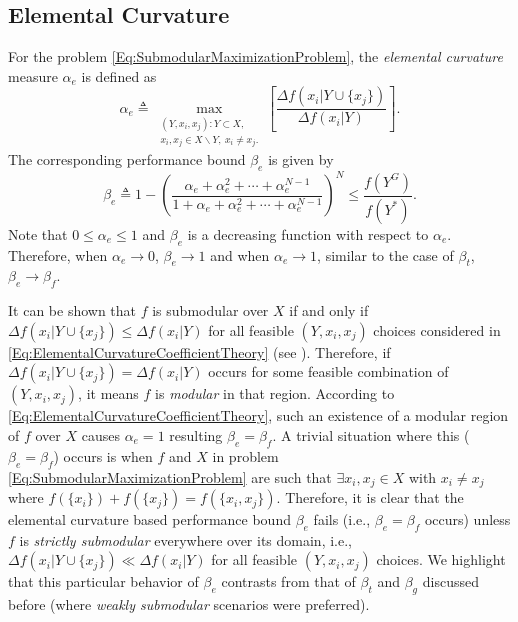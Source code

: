 \documentclass[conference]{IEEEtran}
\begin{document}

\subsection{Elemental Curvature \cite{Wang2016}}\label{SubSec:ElementalCurvature}

For the problem \eqref{Eq:SubmodularMaximizationProblem}, the \emph{elemental curvature} measure $\alpha_e$ is defined as 
\begin{equation}\label{Eq:ElementalCurvatureCoefficientTheory}
    \alpha_e \triangleq \max_{\substack{(Y,x_i,x_j): Y \subset X,\\ x_i,x_j \in X \backslash Y,\ x_i \neq x_j.}}\left[\frac{\Delta f(x_i \vert Y \cup \{x_j\})}{\Delta f(x_i \vert Y)}\right].
\end{equation}
The corresponding performance bound $\beta_e$ is given by 
\begin{equation}\label{Eq:ElementalCurvatureBoundTheory}
    \beta_e \triangleq 1-\left(\frac{\alpha_e + \alpha_e^2 + \cdots + \alpha_e^{N-1}}{1 + \alpha_e + \alpha_e^2 + \cdots + \alpha_e^{N-1}}\right)^N \leq \frac{f(Y^G)}{f(Y^*)}.
\end{equation}
Note that $0 \leq \alpha_e \leq 1$ and $\beta_e$ is a decreasing function with respect to $\alpha_e$. Therefore, when $\alpha_e \rightarrow 0$, $\beta_e \rightarrow 1$ and when $\alpha_e \rightarrow 1$, similar to the case of $\beta_t$, $\beta_e \rightarrow \beta_f$.



It can be shown that $f$ is submodular over $X$ if and only if $\Delta f(x_i \vert Y \cup  \{x_j\}) \leq \Delta f(x_i \vert Y)$ for all feasible $(Y,x_i,x_j)$ choices considered in \eqref{Eq:ElementalCurvatureCoefficientTheory} (see \cite[Prop. 2.1]{Nemhauser1978}). 
Therefore, if $\Delta f(x_i \vert Y \cup  \{x_j\}) = \Delta f(x_i \vert Y)$ occurs for some feasible combination of $(Y,x_i,x_j)$, it means $f$ is \emph{modular} in that region. According to \eqref{Eq:ElementalCurvatureCoefficientTheory}, such an existence of a modular region of $f$ over $X$ causes $\alpha_e = 1$ resulting $\beta_e = \beta_f$. A trivial situation where this ($\beta_e = \beta_f$) occurs is when $f$ and $X$ in problem \eqref{Eq:SubmodularMaximizationProblem} are such that $\exists x_i,x_j \in X$ with $x_i \neq x_j$ where $f(\{x_i\}) + f(\{x_j\}) = f(\{x_i,x_j\})$. Therefore, it is clear that the elemental curvature based performance bound $\beta_e$ fails (i.e., $\beta_e = \beta_f$ occurs) unless $f$ is \emph{strictly submodular} everywhere over its domain, i.e., $\Delta f(x_i \vert Y \cup  \{x_j\}) \ll \Delta f(x_i \vert Y)$ for all feasible $(Y,x_i,x_j)$ choices. We highlight that this particular behavior of $\beta_e$ contrasts from that of $\beta_t$ and $\beta_g$ discussed before (where \emph{weakly submodular} scenarios were preferred). 
\end{document}
